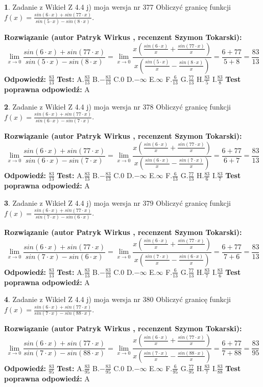 \documentclass[12pt, a4paper]{article}
\theoremstyle{definition} %
\newtheorem{zad}{}
\newcommand{\zadStart}[1]{\begin{zad}#1\newline}
\newcommand{\zadStop}{\end{zad}}
\newcommand{\rozwStart}[2]{\noindent \textbf{Rozwiązanie (autor #1 , recenzent #2): }\newline}
\newcommand{\rozwStop}{\newline}
\newcommand{\odpStart}{\noindent \textbf{Odpowiedź:}\newline}
\newcommand{\odpStop}{\newline}
\newcommand{\testStart}{\noindent \textbf{Test:}\newline}
\newcommand{\testStop}{\newline}
\newcommand{\kluczStart}{\noindent \textbf{Test poprawna odpowiedź:}\newline}
\newcommand{\kluczStop}{\newline}
\begin{document}
\zadStart{Zadanie z Wikieł Z 4.4 j) moja wersja nr 377}
Obliczyć granicę funkcji $f(x)=\frac{sin(6\cdot x) +sin(77\cdot x)}{sin(5\cdot x) -sin(8\cdot x)}$.
\zadStop
\rozwStart{Patryk Wirkus}{Szymon Tokarski}
$$\lim\limits_{x\to 0}\frac{sin(6\cdot x) +sin(77\cdot x)}{sin(5\cdot x) -sin(8\cdot x)}=\lim\limits_{x\to 0}\frac{x(\frac{sin(6\cdot x)}{x}+\frac{sin(77\cdot x)}{x})}{x(\frac{sin(5\cdot x)}{x}-\frac{sin(8\cdot x)}{x})}=\frac{6+77}{5+8} = \frac{83}{13}$$
\rozwStop
\odpStart
$\frac{83}{13}$
\odpStop
\testStart
A.$\frac{83}{13}$
B.$-\frac{83}{13}$
C.$0$
D.$-\infty$
E.$\infty$
F.$\frac{6}{13}$
G.$\frac{77}{13}$
H.$\frac{83}{5}$
I.$\frac{83}{8}$
\testStop
\kluczStart
A
\kluczStop



\zadStart{Zadanie z Wikieł Z 4.4 j) moja wersja nr 378}
Obliczyć granicę funkcji $f(x)=\frac{sin(6\cdot x) +sin(77\cdot x)}{sin(6\cdot x) -sin(7\cdot x)}$.
\zadStop
\rozwStart{Patryk Wirkus}{Szymon Tokarski}
$$\lim\limits_{x\to 0}\frac{sin(6\cdot x) +sin(77\cdot x)}{sin(6\cdot x) -sin(7\cdot x)}=\lim\limits_{x\to 0}\frac{x(\frac{sin(6\cdot x)}{x}+\frac{sin(77\cdot x)}{x})}{x(\frac{sin(6\cdot x)}{x}-\frac{sin(7\cdot x)}{x})}=\frac{6+77}{6+7} = \frac{83}{13}$$
\rozwStop
\odpStart
$\frac{83}{13}$
\odpStop
\testStart
A.$\frac{83}{13}$
B.$-\frac{83}{13}$
C.$0$
D.$-\infty$
E.$\infty$
F.$\frac{6}{13}$
G.$\frac{77}{13}$
H.$\frac{83}{6}$
I.$\frac{83}{7}$
\testStop
\kluczStart
A
\kluczStop



\zadStart{Zadanie z Wikieł Z 4.4 j) moja wersja nr 379}
Obliczyć granicę funkcji $f(x)=\frac{sin(6\cdot x) +sin(77\cdot x)}{sin(7\cdot x) -sin(6\cdot x)}$.
\zadStop
\rozwStart{Patryk Wirkus}{Szymon Tokarski}
$$\lim\limits_{x\to 0}\frac{sin(6\cdot x) +sin(77\cdot x)}{sin(7\cdot x) -sin(6\cdot x)}=\lim\limits_{x\to 0}\frac{x(\frac{sin(6\cdot x)}{x}+\frac{sin(77\cdot x)}{x})}{x(\frac{sin(7\cdot x)}{x}-\frac{sin(6\cdot x)}{x})}=\frac{6+77}{7+6} = \frac{83}{13}$$
\rozwStop
\odpStart
$\frac{83}{13}$
\odpStop
\testStart
A.$\frac{83}{13}$
B.$-\frac{83}{13}$
C.$0$
D.$-\infty$
E.$\infty$
F.$\frac{6}{13}$
G.$\frac{77}{13}$
H.$\frac{83}{7}$
I.$\frac{83}{6}$
\testStop
\kluczStart
A
\kluczStop



\zadStart{Zadanie z Wikieł Z 4.4 j) moja wersja nr 380}
Obliczyć granicę funkcji $f(x)=\frac{sin(6\cdot x) +sin(77\cdot x)}{sin(7\cdot x) -sin(88\cdot x)}$.
\zadStop
\rozwStart{Patryk Wirkus}{Szymon Tokarski}
$$\lim\limits_{x\to 0}\frac{sin(6\cdot x) +sin(77\cdot x)}{sin(7\cdot x) -sin(88\cdot x)}=\lim\limits_{x\to 0}\frac{x(\frac{sin(6\cdot x)}{x}+\frac{sin(77\cdot x)}{x})}{x(\frac{sin(7\cdot x)}{x}-\frac{sin(88\cdot x)}{x})}=\frac{6+77}{7+88} = \frac{83}{95}$$
\rozwStop
\odpStart
$\frac{83}{95}$
\odpStop
\testStart
A.$\frac{83}{95}$
B.$-\frac{83}{95}$
C.$0$
D.$-\infty$
E.$\infty$
F.$\frac{6}{95}$
G.$\frac{77}{95}$
H.$\frac{83}{7}$
I.$\frac{83}{88}$
\testStop
\kluczStart
A
\kluczStop
\end{document}
